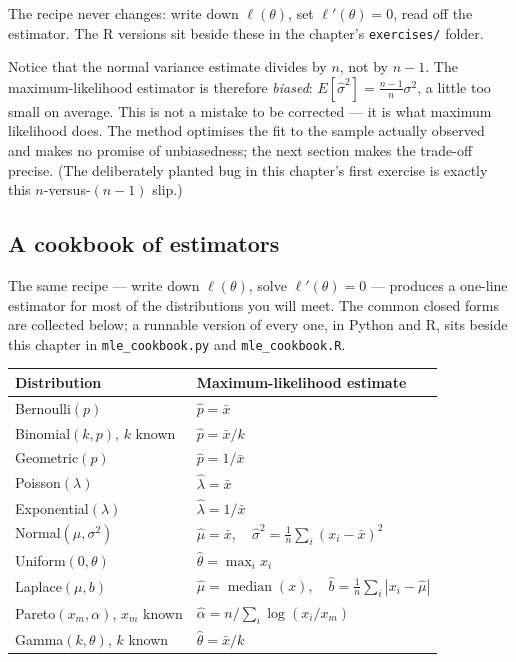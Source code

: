\documentclass[11pt]{article}
\begin{document}
\noindent The recipe never changes: write down $\ell(\theta)$, set
$\ell'(\theta)=0$, read off the estimator. The R versions sit beside these
in the chapter's \texttt{exercises/} folder.

\begin{editorialnote}
Notice that the normal variance estimate divides by $n$, not by $n-1$. The
maximum-likelihood estimator is therefore \emph{biased}:
$E[\hat\sigma^2] = \frac{n-1}{n}\sigma^2$, a little too small on average.
This is not a mistake to be corrected --- it is what maximum likelihood
does. The method optimises the fit to the sample actually observed and
makes no promise of unbiasedness; the next section makes the trade-off
precise. (The deliberately planted bug in this chapter's first exercise is
exactly this $n$-versus-$(n-1)$ slip.)
\end{editorialnote}

\subsection*{A cookbook of estimators}

The same recipe --- write down $\ell(\theta)$, solve $\ell'(\theta)=0$ ---
produces a one-line estimator for most of the distributions you will meet.
The common closed forms are collected below; a runnable version of every one,
in Python and R, sits beside this chapter in \texttt{mle\_cookbook.py} and
\texttt{mle\_cookbook.R}.

\begin{center}
{\small
\renewcommand{\arraystretch}{1.35}
\begin{tabular}{@{}ll@{}}
\hline
\textbf{Distribution} & \textbf{Maximum-likelihood estimate} \\
\hline
Bernoulli$(p)$ & $\hat p = \bar x$ \\
Binomial$(k,p)$, $k$ known & $\hat p = \bar x / k$ \\
Geometric$(p)$ & $\hat p = 1/\bar x$ \\
Poisson$(\lambda)$ & $\hat\lambda = \bar x$ \\
Exponential$(\lambda)$ & $\hat\lambda = 1/\bar x$ \\
Normal$(\mu,\sigma^2)$ & $\hat\mu=\bar x,\quad \hat\sigma^2=\tfrac1n\sum_i (x_i-\bar x)^2$ \\
Uniform$(0,\theta)$ & $\hat\theta=\max_i x_i$ \\
Laplace$(\mu,b)$ & $\hat\mu=\operatorname{median}(x),\quad \hat b=\tfrac1n\sum_i|x_i-\hat\mu|$ \\
Pareto$(x_m,\alpha)$, $x_m$ known & $\hat\alpha = n\big/\sum_i \log(x_i/x_m)$ \\
Gamma$(k,\theta)$, $k$ known & $\hat\theta=\bar x/k$ \\
\hline
\end{tabular}
}
\end{center}
\end{document}
